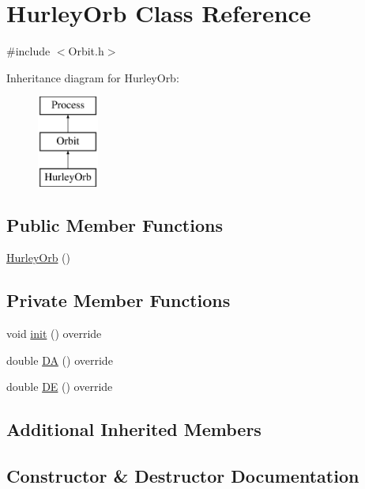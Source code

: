 \hypertarget{class_hurley_orb}{}\section{Hurley\+Orb Class Reference}
\label{class_hurley_orb}


{\ttfamily \#include $<$Orbit.\+h$>$}

Inheritance diagram for Hurley\+Orb\+:\begin{figure}[H]
\begin{center}
\leavevmode
\includegraphics[height=3.000000cm]{class_hurley_orb}
\end{center}
\end{figure}
\subsection*{Public Member Functions}
\begin{DoxyCompactItemize}
\item 
\hyperlink{class_hurley_orb_aa7dbb96e8fda58a5250e4c333740529c}{Hurley\+Orb} ()
\end{DoxyCompactItemize}
\subsection*{Private Member Functions}
\begin{DoxyCompactItemize}
\item 
void \hyperlink{class_hurley_orb_afba6609e2719852d8cf13b5046be6128}{init} () override
\item 
double \hyperlink{class_hurley_orb_af4ef7b4bd24e22e010b96f7bc6d872f6}{DA} () override
\item 
double \hyperlink{class_hurley_orb_ad0c599c31dad0585d007c08eb22cbc89}{DE} () override
\end{DoxyCompactItemize}
\subsection*{Additional Inherited Members}


\subsection{Constructor \& Destructor Documentation}
\mbox{\label{class_hurley_orb_aa7dbb96e8fda58a5250e4c333740529c}} 
